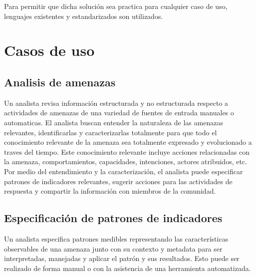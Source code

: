 Para permitir que dicha solución sea practica para cualquier caso de uso, 
lenguajes existentes y estandarizados son utilizados.

\section{Casos de uso}
\subsection{Analisis de amenazas}
Un analista revisa información estructurada y no estructurada respecto a 
actividades de amenazas de una variedad de fuentes de entrada manuales o 
automaticas. El analista buscan entender la naturaleza de las amenazas 
relevantes, identificarlas y caracterizarlas totalmente para que todo el 
conocimiento relevante de la amenaza sea totalmente expresado y evolucionado a 
traves del tiempo. Este conocimiento relevante incluye acciones relacionadas con 
la amenaza, comportamientos, capacidades, intenciones, actores atribuidos, etc. 
Por medio del entendimiento y la caracterización, el analista puede especificar 
patrones de indicadores relevantes, sugerir acciones para las actividades de 
respuesta y compartir la información con miembros de la comunidad.

\subsection{Especificación de patrones de indicadores}
Un analista especifica patrones medibles representando las características 
observables de una amenaza junto con su contexto y metadata para ser 
interpretadas, manejadas y aplicar el patrón y sus resultados. Esto puede ser 
realizado de forma manual o con la asistencia de una herramienta automatizada.


